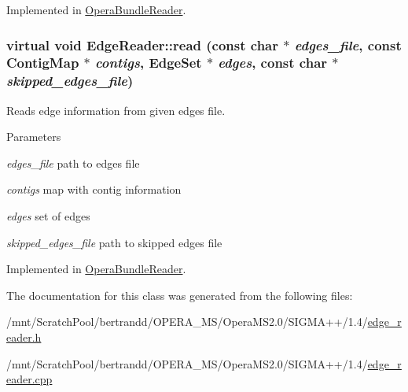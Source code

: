 Implemented in \hyperlink{classOperaBundleReader_a822e6a9b0ce2d1dd9353a692f328cac6}{OperaBundleReader}.\hypertarget{classEdgeReader_a3c929904fe67018b74f4c180bada33dd}{
\subsubsection[{read}]{\setlength{\rightskip}{0pt plus 5cm}virtual void EdgeReader::read (const char $\ast$ {\em edges\_\-file}, \/  const {\bf ContigMap} $\ast$ {\em contigs}, \/  {\bf EdgeSet} $\ast$ {\em edges}, \/  const char $\ast$ {\em skipped\_\-edges\_\-file})}}
\label{classEdgeReader_a3c929904fe67018b74f4c180bada33dd}


Reads edge information from given edges file. 
\begin{DoxyParams}{Parameters}
\item[{\em edges\_\-file}]path to edges file \item[{\em contigs}]map with contig information \item[{\em edges}]set of edges \item[{\em skipped\_\-edges\_\-file}]path to skipped edges file \end{DoxyParams}


Implemented in \hyperlink{classOperaBundleReader_ad85e56642c7d4b0c65dfbb2dbbf59029}{OperaBundleReader}.

The documentation for this class was generated from the following files:\begin{DoxyCompactItemize}
\item 
/mnt/ScratchPool/bertrandd/OPERA\_\-MS/OperaMS2.0/SIGMA++/1.4/\hyperlink{edge__reader_8h}{edge\_\-reader.h}\item 
/mnt/ScratchPool/bertrandd/OPERA\_\-MS/OperaMS2.0/SIGMA++/1.4/\hyperlink{edge__reader_8cpp}{edge\_\-reader.cpp}\end{DoxyCompactItemize}
